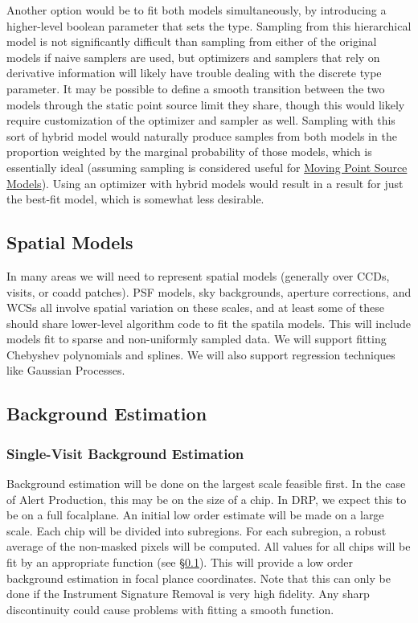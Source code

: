 Another option would be to fit both models simultaneously, by introducing a higher-level boolean parameter that sets the type.  Sampling from this hierarchical model is not significantly difficult than sampling from either of the original models if naive samplers are used, but optimizers and samplers that rely on derivative information will likely have trouble dealing with the discrete type parameter.  It may be possible to define a smooth transition between the two models through the static point source limit they share, though this would likely require customization of the optimizer and sampler as well.  Sampling with this sort of hybrid model would naturally produce samples from both models in the proportion weighted by the marginal probability of those models, which is essentially ideal (assuming sampling is considered useful for \hyperref[sec:acMovingPointSourceModels]{Moving Point Source Models}).  Using an optimizer with hybrid models would result in a result for just the best-fit model, which is somewhat less desirable.

\subsection{Spatial Models}
\label{sec:acSpatialModels}
In many areas we will need to represent spatial models (generally over CCDs, visits, or coadd patches).  PSF models, sky backgrounds, aperture corrections, and WCSs all involve spatial variation on these scales, and at least some of these should share lower-level algorithm code to fit the spatila models.  This will include models fit to sparse and non-uniformly sampled data.  We will support fitting Chebyshev polynomials and splines.  We will also support regression techniques like Gaussian Processes.

\subsection{Background Estimation}
\label{sec:acBackgroundEstimation}

\subsubsection{Single-Visit Background Estimation}
\label{sec:acSingleVisitBackgroundEstimation}

Background estimation will be done on the largest scale feasible first.  In the case of Alert Production, this may be on the size of a chip.  In DRP, we expect this to be on a full focalplane.  An initial low order estimate will be made on a large scale.  Each chip will be divided into subregions.  For each subregion, a robust average of the non-masked pixels will be computed.  All values for all chips will be fit by an appropriate function (see \S \ref{sec:acSpatialModels}).  This will provide a low order background estimation in focal plance coordinates.  Note that this can only be done if the Instrument Signature Removal is very high fidelity.  Any sharp discontinuity could cause problems with fitting a smooth function.

